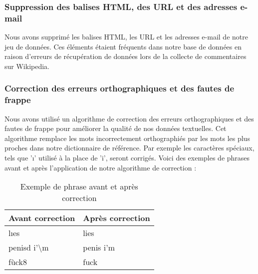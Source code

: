 \subsubsection*{Suppression des balises HTML, des URL et des adresses e-mail}

Nous avons supprimé les balises HTML, les URL et les adresses e-mail de notre jeu de données. Ces éléments étaient fréquents dans notre base de données en raison d'erreurs de récupération de données lors de la collecte de commentaires sur Wikipedia.
\newpage
\subsubsection*{Correction des erreurs orthographiques et des fautes de frappe}

Nous avons utilisé un algorithme de correction des erreurs orthographiques et des fautes de frappe pour améliorer la qualité de nos données textuelles. Cet algorithme remplace les mots incorrectement orthographiés par les mots les plus proches dans notre dictionnaire de référence. Par exemple les caractères spéciaux, tels que 'ı' utilisé à la place de 'i', seront corrigés. Voici des exemples de phrases avant et après l'application de notre algorithme de correction :

\begin{table}[h]
    \centering
    \begin{tabular}{|l|l|}
    \hline
    \textbf{Avant correction} & \textbf{Après correction} \\ \hline
    lıes  & lies \\ \hline
    penisd i'\textbackslash m & penis i'm  \\ \hline
    fùck8 & fuck  \\ \hline
    \end{tabular}
    \caption{Exemple de phrase avant et après correction}
\end{table}